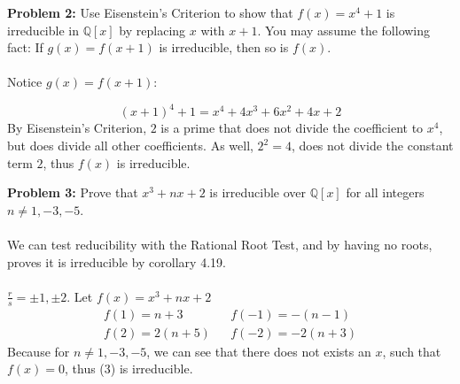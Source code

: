 \documentclass[12pt]{article}
\begin{document}
\newpage 

\noindent \textbf{Problem 2: }Use Eisenstein’s Criterion to show that $f(x) = x^4+ 1$ is irreducible in $\mathbb{Q}[x]$ by replacing $x$ with $x+1$. You may assume the following fact: If $g(x) = f(x+1)$ is irreducible,
then so is $f(x)$.
\\ \\
Notice $g(x) = f(x + 1)$:

	$$
	(x+1)^4 + 1 = x^4 + 4x^3 + 6x^2 + 4x + 2
	$$
By Eisenstein's Criterion, $2$ is a prime that does not divide the coefficient to $x^4$, but does divide all other coefficients.  As well, $2^2 = 4$, does not divide the constant term $2$, thus $f(x)$ is irreducible.


\vspace{\baselineskip}
\vspace{\baselineskip}
\vspace{\baselineskip}
\vspace{\baselineskip}
\vspace{\baselineskip}
\vspace{\baselineskip}

\noindent \textbf{Problem 3: } Prove that $x^3+nx+2$ is irreducible over $\mathbb{Q}[x]$ for all integers $n \not= 1, -3, -5$.
\\ \\
We can test reducibility with the Rational Root Test, and by having no roots, proves it is irreducible by corollary 4.19.
\\ \\
	$\frac{r}{s} = \pm 1, \pm 2$.  Let $f(x) = x^3+nx+2$ 
	\begin{align*}
		f(1) = n + 3 && f(-1) = -(n - 1) \\
		f(2) = 2(n + 5)&& f(-2) = -2(n+3)
	\end{align*}
Because for $n \not= 1, -3, -5$, we can see that there does not exists an $x$, such that $f(x) = 0$, thus (3) is irreducible.
\end{document}
